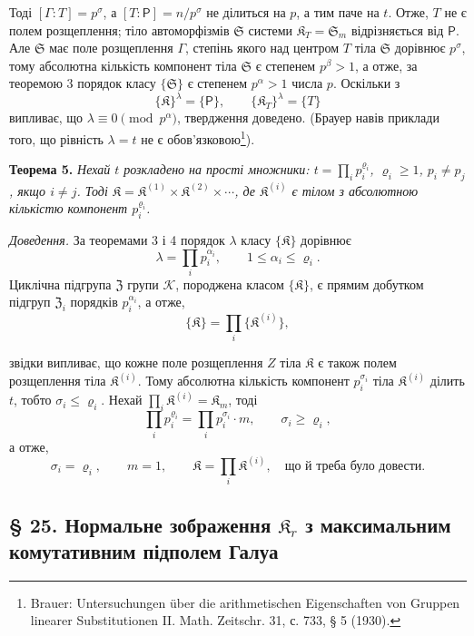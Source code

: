 \documentclass[11pt]{article}
\newcommand{\srcfn}[2]{\footnote{#2}}
\begin{document}
Тоді \([\Gamma:T]=p^\sigma\), а \([T:\mathsf P]=n/p^\sigma\) не ділиться на \(p\), а тим паче на \(t\). Отже, \(T\) не є полем розщеплення; тіло автоморфізмів \(\mathfrak S\) системи \(\mathfrak K_T=\mathfrak S_m\) відрізняється від \(\mathsf P\). Але \(\mathfrak S\) має поле розщеплення \(\Gamma\), степінь якого над центром \(T\) тіла \(\mathfrak S\) дорівнює \(p^\sigma\), тому абсолютна кількість компонент тіла \(\mathfrak S\) є степенем \(p^\beta>1\), а отже, за теоремою 3 порядок класу \(\{\mathfrak S\}\) є степенем \(p^\alpha>1\) числа \(p\). Оскільки з
\[
\{\mathfrak K\}^{\lambda}=\{\mathsf P\},
\qquad
\{\mathfrak K_T\}^{\lambda}=\{T\}
\]
випливає, що \(\lambda\equiv0\pmod {p^\alpha}\), твердження доведено. (Брауер навів приклади того, що рівність \(\lambda=t\) не є обов'язковою\srcfn{1}{Brauer: Untersuchungen über die arithmetischen Eigenschaften von Gruppen linearer Substitutionen II. Math. Zeitschr. 31, с. 733, § 5 (1930).}).

\textbf{Теорема 5.} \emph{Нехай \(t\) розкладено на прості множники: \(t=\prod_i p_i^{\varrho_i}\), \(\varrho_i\ge1\), \(p_i\ne p_j\), якщо \(i\ne j\). Тоді \(\mathfrak K=\mathfrak K^{(1)}\times\mathfrak K^{(2)}\times\cdots\), де \(\mathfrak K^{(i)}\) є тілом з абсолютною кількістю компонент \(p_i^{\varrho_i}\).}

\emph{Доведення.} За теоремами 3 і 4 порядок \(\lambda\) класу \(\{\mathfrak K\}\) дорівнює
\[
\lambda=\prod_i p_i^{\alpha_i},\qquad 1\le\alpha_i\le\varrho_i.
\]
Циклічна підгрупа \(\mathfrak Z\) групи \(\mathscr K\), породжена класом \(\{\mathfrak K\}\), є прямим добутком підгруп \(\mathfrak Z_i\) порядків \(p_i^{\alpha_i}\), а отже,
\[
\{\mathfrak K\}=\prod_i\{\mathfrak K^{(i)}\},
\]

звідки випливає, що кожне поле розщеплення \(Z\) тіла \(\mathfrak K\) є також полем розщеплення тіла \(\mathfrak K^{(i)}\). Тому абсолютна кількість компонент \(p_i^{\sigma_i}\) тіла \(\mathfrak K^{(i)}\) ділить \(t\), тобто \(\sigma_i\le\varrho_i\). Нехай \(\prod_i \mathfrak K^{(i)}=\mathfrak K_m\), тоді
\[
\prod_i p_i^{\varrho_i}=\prod_i p_i^{\sigma_i}\cdot m,
\qquad
\sigma_i\ge\varrho_i,
\]
а отже,
\[
\sigma_i=\varrho_i,\qquad m=1,\qquad
\mathfrak K=\prod_i \mathfrak K^{(i)},
\quad\text{що й треба було довести.}
\]

\subsection*{§ 25. Нормальне зображення \(\mathfrak K_r\) з максимальним комутативним підполем Галуа\protect\footnotemark}
\label{normaldarstellung-von-r_r-mit-galoisschem-maximalem-kommutativem-teilkoerper-1}
\end{document}
